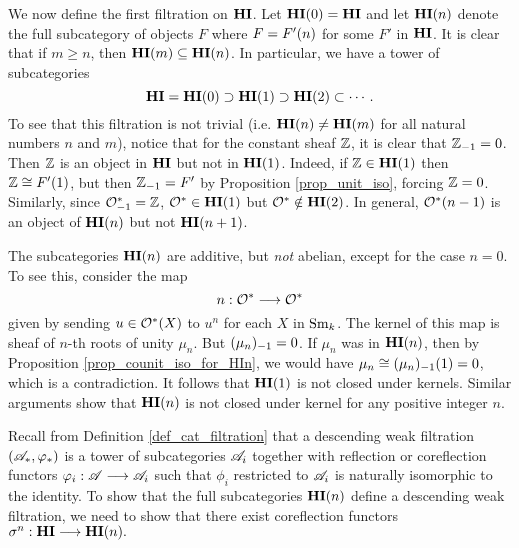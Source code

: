 We now define the first filtration on $\HI$. Let $\LHI[0]{\HI} = 
\HI$ and let $\LHI[n]{\HI}$ denote the full subcategory of objects 
$F$ where $F = \LHI[n]{F'}$ for some $F'$ in $\HI$. It is clear 
that if $m \geq n$, then $\LHI[m]{\HI} \subseteq \LHI[n]{\HI}$. 
In particular, we have a tower of subcategories
\[
\HI = \LHI[0]{\HI} \supset \LHI[1]{\HI} \supset \LHI[2]{\HI} 
\subset \cdots.
\]
To see that this filtration is not trivial (i.e. $\LHI[n]{\HI} \neq
\LHI[m]{\HI}$ for all natural numbers $n$ and $m$), notice that
for the constant sheaf $\Z$, it is clear that $\RHI{\Z} = 0$. 
Then $\Z$ is an object in $\HI$ but not in $\LHI{\HI}$. Indeed, if 
$\Z \in \LHI{\HI}$ then $\Z \cong \LHI{F'}$, but then $\RHI{\Z} = F'$ 
by Proposition \ref{prop_unit_iso}, forcing $\Z = 0$. Similarly, 
since $\RHI{\Ox} = \Z$, $\Ox \in \LHI{\HI}$ but $\Ox \notin
\LHI[2]{\HI}$. In general, $\LHI[n - 1]{\Ox}$ is an object of
$\LHI[n]{\HI}$ but not $\LHI[n + 1]{\HI}$.

\begin{rmk}
The subcategories $\LHI[n]{\HI}$ are additive, but \emph{not} 
abelian, except for the case $n = 0$. To see this, consider the 
map
\[
n: \Ox \to \Ox
\]
given by sending $u \in \Ox(X)$ to $u^n$ for each $X$ in $\Sm$.  The
kernel of this map is sheaf of $n$-th roots of unity $\mu_n$.  But
$\RHI{(\mu_n)} = 0$. If $\mu_n$ was in $\LHI[n]{\HI}$, then by
Proposition \ref{prop_counit_iso_for_HIn}, we would have $\mu_n \cong
\LHI[1]{\RHI[1]{(\mu_n)}} = 0$, which is a contradiction. It follows
that $\LHI{\HI}$ is not closed under kernels. Similar arguments show
that $\LHI[n]{\HI}$ is not closed under kernel for any positive
integer $n$.
\end{rmk}

Recall from Definition \ref{def_cat_filtration} that a descending weak
filtration $(\Cat{A}_*, \phi_*)$ is a tower of subcategories
$\Cat{A}_i$ together with reflection or coreflection functors $\phi_i:
\Cat{A} \to \Cat{A}_i$ such that $\phi_i$ restricted to $\Cat{A}_i$ is
naturally isomorphic to the identity.  To show that the full
subcategories $\LHI[n]{\HI}$ define a descending weak filtration, we
need to show that there exist coreflection functors $\sgHI{n}: \HI \to
\LHI[n]{\HI}.$

